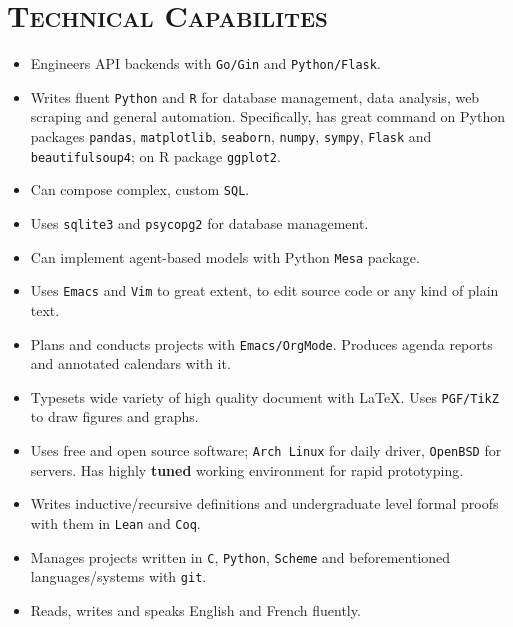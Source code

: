 \documentclass[oneside, 11pt]{memoir}
\begin{document}
\section*{\textsc{Technical Capabilites}}
\begin{itemize}[leftmargin=*]
  \item Engineers API backends with \texttt{Go/Gin} and
    \texttt{Python/Flask}.
  \item Writes fluent \texttt{Python} and \texttt{R} for database
    management, data analysis, web scraping and general automation.
    Specifically, has great command on Python packages \texttt{pandas},
    \texttt{matplotlib}, \texttt{seaborn}, \texttt{numpy},
    \texttt{sympy}, \texttt{Flask} and \texttt{beautifulsoup4}; on R
    package \texttt{ggplot2}.
  \item Can compose complex, custom \texttt{SQL}.
  \item Uses \texttt{sqlite3} and \texttt{psycopg2} for database
    management.
  \item Can implement agent-based models with Python \texttt{Mesa}
    package.
  \item Uses \texttt{Emacs} and \texttt{Vim} to great extent, to edit
  source code or any kind of plain text.
  \item Plans and conducts projects with \texttt{Emacs/OrgMode}.
  Produces agenda reports and annotated calendars with it.
  \item Typesets wide variety of high quality document with \LaTeX. Uses
  \texttt{PGF/TikZ} to draw figures and graphs.
  \item Uses free and open source software; \texttt{Arch Linux} for daily
    driver, \texttt{OpenBSD} for servers. Has highly \textbf{tuned}
    working environment for rapid prototyping.
  \item Writes inductive/recursive definitions and undergraduate level
    formal proofs with them in \texttt{Lean} and \texttt{Coq}.
  \item Manages projects written in \texttt{C}, \texttt{Python},
  \texttt{Scheme} and beforementioned languages/systems with
  \texttt{git}.
  \item Reads, writes and speaks English and French fluently.
\end{itemize}
\pagebreak
\end{document}
